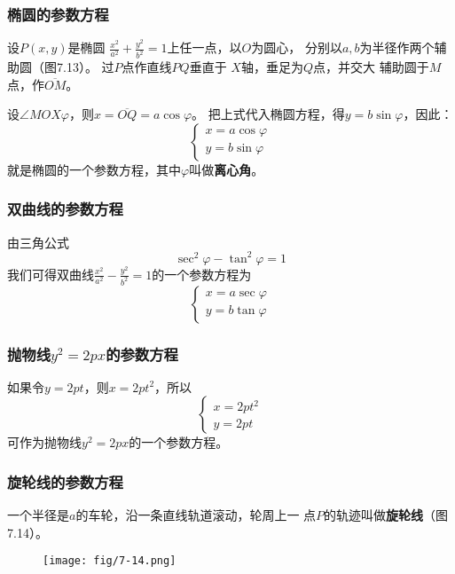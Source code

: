 \subsubsection{椭圆的参数方程}
    设$P(x,y)$是椭圆
$\frac{x^2}{a^2}+\frac{y^2}{b^2}=1$上任一点，以$O$为圆心，
分别以$a,b$为半径作两个辅助圆（图7.13）。
过$P$点作直线$PQ$垂直于
$X$轴，垂足为$Q$点，并交大
辅助圆于$M$点，作$\overline{OM}$。

设$\angle MOX\varphi$，则$x=\overline{OQ}=a\cos\varphi$。
把上式代入椭圆方程，得$y=b\sin\varphi$，因此：
\begin{equation}
    \begin{cases}
        x=a\cos\varphi\\
        y=b\sin\varphi     
    \end{cases}
\end{equation}
就是椭圆的一个参数方程，其中$\varphi$叫做\textbf{离心角}。

\subsubsection{双曲线的参数方程}

由三角公式
\[\sec^2\varphi-\tan^2\varphi=1\]
我们可得双曲线$\frac{x^2}{a^2}-\frac{y^2}{b^2}=1$的一个参数方程为
\begin{equation}
    \begin{cases}
        x=a\sec\varphi\\
       y=b\tan\varphi
    \end{cases}
\end{equation}

\subsubsection{抛物线$y^2=2px$的参数方程}

如果令$y=2pt$，则$x=2pt^2$，所以
\begin{equation}
    \begin{cases}
        x=2pt^2\\ y=2pt
    \end{cases}
\end{equation}
可作为抛物线$y^2=2px$的一个参数方程。

\subsubsection{旋轮线的参数方程}
一个半径是$a$的车轮，沿一条直线轨道滚动，轮周上一
点$P$的轨迹叫做\textbf{旋轮线}（图7.14）。
\begin{figure}[htp]
    \centering
\texttt{[image: fig/7-14.png]}
    \caption{}
\end{figure}


